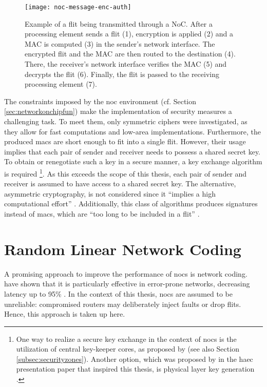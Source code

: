 \begin{figure}
    \centering
    \texttt{[image: noc-message-enc-auth]}
    \caption[Flit through NoC with encryption and authentication]{Example of a flit being transmitted through a NoC. After a processing element sends a flit (1),
    encryption is applied (2) and a MAC is computed (3) in the sender's network interface. The encrypted flit and the MAC are then routed to the
    destination (4). There, the receiver's network interface verifies the MAC (5) and decrypts the flit (6). Finally, the flit is passed to the
    receiving processing element (7).} %
    \label{fig:nocflitencauth}
\end{figure}

The constraints imposed by the \gls{noc} environment (cf. Section \ref{sec:networkonchipfun}) make the implementation of security measures a
challenging task. To meet them, only symmetric ciphers were investigated, as they allow for fast computations and low-area implementations.
Furthermore, the produced \glspl{mac} are short enough to fit into a single flit. However, their usage implies that each pair of
sender and receiver needs to possess a shared secret key. To obtain or renegotiate such a key in a secure manner, a key exchange algorithm is required
\footnote{One way to realize a secure key exchange in the context of \glspl{noc} is the utilization of central key-keeper cores, as proposed by
\citeauthor{gebotys03securityframework} \cite{gebotys03securityframework} (see also Section \ref{subsec:securityzones}). Another option, which was proposed by
\citeauthor{matthiesen17haec} in the \gls{haec} presentation paper that inspired this thesis, is physical layer key generation \cite[4]{matthiesen17haec}.}.
As this exceeds the scope of this thesis, each pair of sender and receiver is assumed to have access to a shared secret key. The alternative, asymmetric
cryptography, is not considered since it \enquote{implies a high computational effort} \cite[3]{moriam18activeattackers}. Additionally, this class of
algorithms produces signatures instead of \glspl{mac}, which are \enquote{too long to be included in a flit} \cite[3]{moriam18activeattackers}.

\section{Random Linear Network Coding}
A promising approach to improve the performance of \glspl{noc} is network coding. \citeauthor{moriam15manycorenc} have shown that it is particularly
effective in error-prone networks, decreasing latency up to 95\% \cite[7]{moriam15manycorenc}. In the context of this thesis, \glspl{noc} are assumed
to be unreliable: compromised routers may deliberately inject faults or drop flits. Hence, this approach is taken up here.

